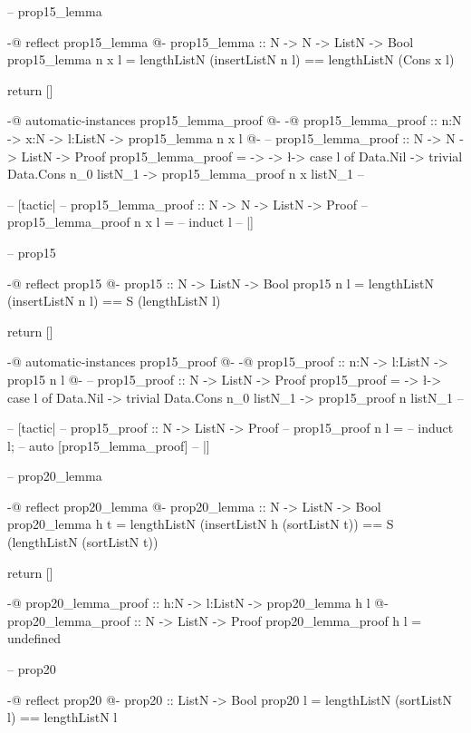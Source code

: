 
-- prop15_lemma

{-@ reflect prop15_lemma @-}
prop15_lemma :: N -> N -> ListN -> Bool
prop15_lemma n x l = lengthListN (insertListN n l) == lengthListN (Cons x l)

return []

{-@ automatic-instances prop15_lemma_proof @-}
{-@
prop15_lemma_proof :: n:N -> x:N -> l:ListN -> {prop15_lemma n x l}
@-}
-- %
prop15_lemma_proof :: N -> N -> ListN -> Proof
prop15_lemma_proof = \n -> \x -> \l -> case l of
                                           Data.Nil -> trivial
                                           Data.Cons n_0 listN_1 -> prop15_lemma_proof n x listN_1
-- %

-- [tactic|
-- prop15_lemma_proof :: N -> N -> ListN -> Proof
-- prop15_lemma_proof n x l =
--   induct l
-- |]

-- prop15

{-@ reflect prop15 @-}
prop15 :: N -> ListN -> Bool
prop15 n l = lengthListN (insertListN n l) == S (lengthListN l)

return []

{-@ automatic-instances prop15_proof @-}
{-@
prop15_proof :: n:N -> l:ListN -> {prop15 n l}
@-}
-- %
prop15_proof :: N -> ListN -> Proof
prop15_proof = \n -> \l -> case l of
                               Data.Nil -> trivial
                               Data.Cons n_0 listN_1 -> prop15_proof n listN_1
-- %

-- [tactic|
-- prop15_proof :: N -> ListN -> Proof
-- prop15_proof n l =
--   induct l;
--   auto [prop15_lemma_proof]
-- |]

-- prop20_lemma

{-@ reflect prop20_lemma @-}
prop20_lemma :: N -> ListN -> Bool
prop20_lemma h t = lengthListN (insertListN h (sortListN t)) == S (lengthListN (sortListN t))

return []

{-@
prop20_lemma_proof :: h:N -> l:ListN -> {prop20_lemma h l}
@-}
prop20_lemma_proof :: N -> ListN -> Proof 
prop20_lemma_proof h l = undefined

-- prop20

{-@ reflect prop20 @-}
prop20 :: ListN -> Bool
prop20 l = lengthListN (sortListN l) == lengthListN l

